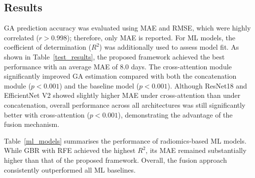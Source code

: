 \documentclass[final,british,a4paper,12pt]{phdthesis}
\begin{document}


\subsection{Results}

GA prediction accuracy was evaluated using MAE and RMSE, which were highly correlated ($r > 0.998$); therefore, only MAE is reported. For ML models, the coefficient of determination ($R^2$) was additionally used to assess model fit. As shown in Table~\ref{test_results}, the proposed framework achieved the best performance with an average MAE of 8.0 days. The cross-attention module significantly improved GA estimation compared with both the concatenation module ($p < 0.001$) and the baseline model ($p < 0.001$). Although ResNet18 and EfficientNet V2 showed slightly higher MAE under cross-attention than under concatenation, overall performance across all architectures was still significantly better with cross-attention ($p < 0.001$), demonstrating the advantage of the fusion mechanism.

Table~\ref{ml_models} summarises the performance of radiomics-based ML models. While GBR with RFE achieved the highest $R^2$, its MAE remained substantially higher than that of the proposed framework. Overall, the fusion approach consistently outperformed all ML baselines.
\end{document}

